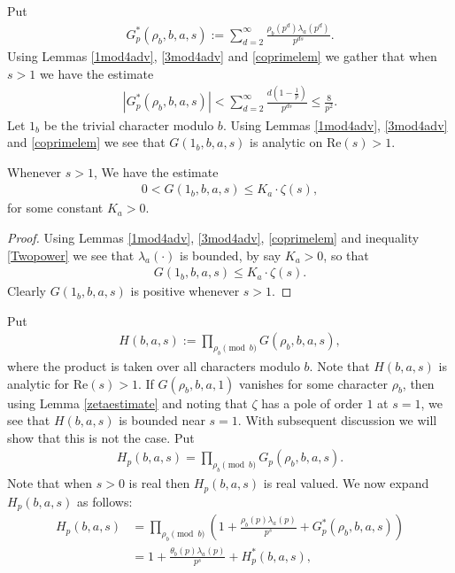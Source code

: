 \documentclass[12pt]{amsart}
\newcommand{\1}{\mathmybb{1}}
\begin{document}
Put
\begin{align*}
G_{p}^{*}(\rho_{b},b,a,s) := \sum_{d=2}^{\infty}\frac{\rho_{b}(p^{d})\lambda_{a}(p^d)}{p^{ds}}.
\end{align*}
Using Lemmas \ref{1mod4adv}, \ref{3mod4adv} and \ref{coprimelem} we gather that when $s>1$ we have the estimate
\begin{align}
\label{Gperror1}
|G^{*}_{p}(\rho_{b},b,a,s)| < \sum_{d=2}^{\infty}\frac{d(1-\frac{1}{p})}{p^{ds}} \leq \frac{8}{p^2}.
\end{align}
Let $1_{b}$ be the trivial character modulo $b$. Using Lemmas \ref{1mod4adv}, \ref{3mod4adv} and \ref{coprimelem} we see that $G(1_{b},b,a,s)$ is analytic on $\text{Re}(s) > 1$.
\begin{lem}
\label{zetaestimate}
Whenever $s>1$, We have the estimate
\begin{align*}
0<G(1_{b},b,a,s) \leq K_{a}\cdot\zeta(s),
\end{align*}
for some constant $K_{a}>0$. 
\end{lem}
\begin{proof}
Using Lemmas \ref{1mod4adv}, \ref{3mod4adv}, \ref{coprimelem} and inequality \eqref{Twopower} we see that $\lambda_{a}(\cdot)$ is bounded, by say $K_{a}>0$, so that
\begin{align*}
G(1_{b},b,a,s) \leq K_{a}\cdot\zeta(s).
\end{align*}
Clearly $G(1_{b},b,a,s)$ is positive whenever $s>1$.
\end{proof}
Put
\begin{align*}
H(b,a,s) := \prod_{\rho_{b} \pmod b}G(\rho_{b},b,a,s),
\end{align*}
where the product is taken over all characters modulo $b$. Note that $H(b,a,s)$ is analytic for $\text{Re}(s)>1$. If $G(\rho_{b},b,a,1)$ vanishes for some character $\rho_{b}$, then using Lemma \ref{zetaestimate} and noting that $\zeta$ has a pole of order $1$ at $s = 1$, we see that $H(b,a,s)$ is bounded near $s=1$. With subsequent discussion we will show that this is not the case. Put
\begin{align*}
H_{p}(b,a,s) = \prod_{\rho_{b}\pmod b}G_{p}(\rho_{b},b,a,s).
\end{align*}
Note that when $s>0$ is real then $H_{p}(b,a,s)$ is real valued. We now expand $H_{p}(b,a,s)$ as follows:
\begin{align}
\label{Hpexpansion}
H_{p}(b,a,s) &= \prod_{\rho_{b}\pmod b}\left(1+\frac{\rho_{b}(p)\lambda_{a}(p)}{p^s} +G_{p}^{*}(\rho_{b},b,a,s)\right)\\
&= 1 +\frac{\theta_{b}(p)\lambda_{a}(p)}{p^s} + H^{*}_{p}(b,a,s),
\end{align}
\end{document}
